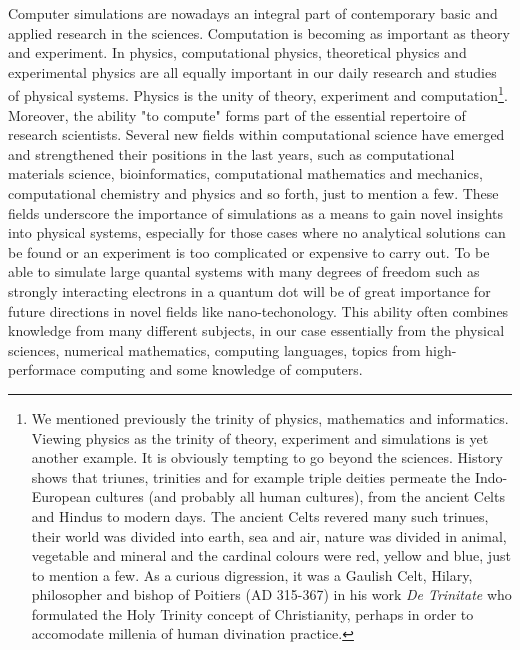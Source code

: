 Computer simulations are nowadays an integral part of contemporary
basic and applied research in the sciences.  Computation is becoming
as important as theory and experiment. In physics, computational
physics, theoretical physics and experimental physics are all equally
important in our daily research and studies of physical
systems. Physics is the unity of theory, experiment and
computation\footnote{We mentioned previously the trinity of physics,
mathematics and informatics. Viewing physics as the trinity of theory,
experiment and simulations is yet another example. It is obviously
tempting to go beyond the sciences. History shows that triunes,
trinities and for example triple deities permeate the Indo-European
cultures (and probably all human cultures), from the ancient Celts and
Hindus to modern days.  The ancient Celts revered many such trinues,
their world was divided into earth, sea and air, nature was divided in
animal, vegetable and mineral and the cardinal colours were red,
yellow and blue, just to mention a few.  As a curious digression, it
was a Gaulish Celt, Hilary, philosopher and bishop of Poitiers (AD
315-367) in his work {\em De Trinitate} who formulated the Holy
Trinity concept of Christianity, perhaps in order to accomodate
millenia of human divination practice.}.  Moreover, the ability "to
compute" forms part of the essential repertoire of research
scientists. Several new fields within computational science have
emerged and strengthened their positions in the last years, such as
computational materials science, bioinformatics, computational
mathematics and mechanics, computational chemistry and physics and so
forth, just to mention a few.  These fields underscore the importance
of simulations as a means to gain novel insights into physical
systems, especially for those cases where no analytical solutions can
be found or an experiment is too complicated or expensive to carry
out.  To be able to simulate large quantal systems with many degrees
of freedom such as strongly interacting electrons in a quantum dot
will be of great importance for future directions in novel fields like
nano-techonology.  This ability often combines knowledge from many
different subjects, in our case essentially from the physical
sciences, numerical mathematics, computing languages, topics from
high-performace computing and some knowledge of computers.


